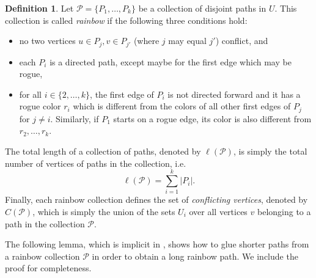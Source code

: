 \documentclass[a4paper,11pt]{article}
\theoremstyle{definition}
\newtheorem{definition}[theorem]{\bf Definition}
\def\cP{\mathcal{P}}
\begin{document}
\begin{definition}
Let $\cP=\{P_1, \dots, P_k\}$ be a collection of disjoint paths in $U$. This collection is called \textit{rainbow} if the following three conditions hold:
\begin{itemize}
    \item no two vertices $u\in P_j, v\in P_{j'}$ (where $j$ may equal $j'$) conflict, and
    \item each $P_i$ is a directed path, except maybe for the first edge which may be rogue,
    \item for all $i\in \{2, \dots, k\}$, the first edge of $P_i$ is not directed forward and it has a rogue color $r_i$ which is different from the colors of all other first edges of $P_j$ for $j\neq i$. Similarly, if $P_1$ starts on a rogue edge, its color is also different from $r_2, \dots, r_{k}$. 
\end{itemize}
The total length of a collection of paths, denoted by $\ell(\cP)$, is simply the total number of vertices of paths in the collection, i.e. 
\[\ell(\cP)=\sum_{i=1}^k |P_i|.\]
Finally, each rainbow collection defines the set of \textit{conflicting vertices}, denoted by $C(\cP)$, which is simply the union of the sets $U_i$ over all vertices $v$ belonging to a path in the collection $\cP$.
\end{definition}

The following lemma, which is implicit in \cite{LS09}, shows how to glue shorter paths from a rainbow collection $\cP$ in order to obtain a long rainbow path. We include the proof for completeness.
\end{document}
